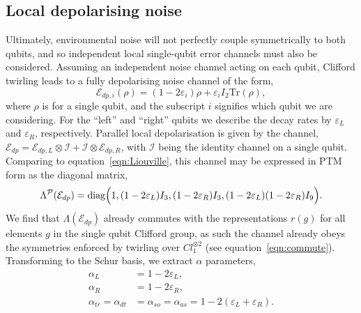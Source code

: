 \subsection{Local depolarising noise}
\label{app:depol_noise}
Ultimately, environmental noise will not perfectly couple symmetrically to both qubits, and so independent local single-qubit error channels must also be considered.
Assuming an independent noise channel acting on each qubit, Clifford twirling leads to a fully depolarising noise channel of the form,
\begin{equation}\label{eqn:1q_depol}
    \mathcal{E}_{dp,i}(\rho)=(1-2\varepsilon_i)\rho+ \varepsilon_iI_2\mathrm{Tr}(\rho),
\end{equation}
where $\rho$ is for a single qubit, and the subscript $i$ signifies which qubit we are considering. For the ``left'' and ``right'' qubits we describe the decay rates by $\varepsilon_L$ and $\varepsilon_R$, respectively.
Parallel local depolarisation is given by the channel, $\mathcal{E}_{dp}=\mathcal{E}_{dp,L}\otimes \mathcal{I} + \mathcal{I}\otimes\mathcal{E}_{dp,R}$, with $\mathcal I$ being the identity channel on a single qubit.
Comparing to equation~\ref{eqn:Liouville}, 
this channel may be expressed in PTM form as the diagonal matrix,
\begin{equation}
    \Lambda^\mathcal{P}(\mathcal{E}_{dp}) = \mathrm{diag}\Bigl(1,(1-2\varepsilon_L)I_3,(1-2\varepsilon_R)I_3,(1-2\varepsilon_L)(1-2\varepsilon_R)I_9\Bigr).
\end{equation}
We find that $\Lambda(\mathcal{E}_{dp})$ already commutes with the representations $r(g)$ for all elements $g$ in the single qubit Clifford group, as such the channel already obeys the symmetries enforced by twirling over $Cl_1^{\otimes 2}$ (see equation~\ref{eqn:commute}). Transforming to the Schur basis, we extract $\alpha$ parameters,
\begin{align}
    \alpha_L &= 1-2\varepsilon_L,\\
    \alpha_R &= 1-2\varepsilon_R,\\
    \alpha_{tr} = \alpha_{dt} &=\alpha_{so}=\alpha_{as} = 1 - 2\left(\varepsilon_L+ \varepsilon_R \right).
\end{align}

